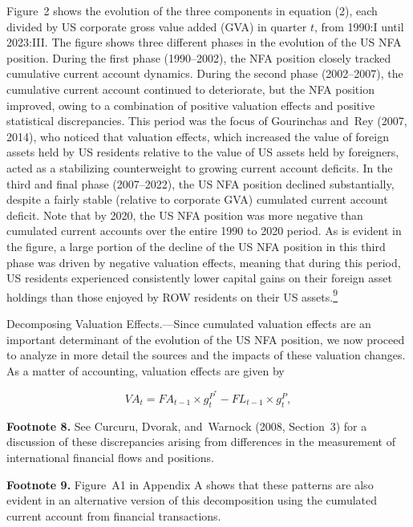 \documentclass[11pt]{article}
\begin{document}
Figure 2 shows the evolution of the three components in equation (2), each divided by US corporate gross value added (GVA) in quarter $t$, from 1990:I until 2023:III. The figure shows three different phases in the evolution of the US NFA position. During the first phase (1990–2002), the NFA position closely tracked cumulative current account dynamics. During the second phase (2002–2007), the cumulative current account continued to deteriorate, but the NFA position improved, owing to a combination of positive valuation effects and positive statistical discrepancies. This period was the focus of Gourinchas and Rey (2007, 2014), who noticed that valuation effects, which increased the value of foreign assets held by US residents relative to the value of US assets held by foreigners, acted as a stabilizing counterweight to growing current account deficits. In the third and final phase (2007–2022), the US NFA position declined substantially, despite a fairly stable (relative to corporate GVA) cumulated current account deficit. Note that by 2020, the US NFA position was more negative than cumulated current accounts over the entire 1990 to 2020 period. As is evident in the figure, a large portion of the decline of the US NFA position in this third phase was driven by negative valuation effects, meaning that during this period, US residents experienced consistently lower capital gains on their foreign asset holdings than those enjoyed by ROW residents on their US assets.\hyperlink{fn:9}{\textsuperscript{9}}


Decomposing Valuation Effects.—Since cumulated valuation effects are an important determinant of the evolution of the US NFA position, we now proceed to analyze in more detail the sources and the impacts of these valuation changes. As a matter of accounting, valuation effects are given by


\setcounter{equation}{2}
\begin{equation}\label{eq:3}
VA_t=FA_{t-1}\times g_t^{P^*}-FL_{t-1}\times g_t^P,
\end{equation}


{\footnotesize \hypertarget{fn:8}{}\textbf{Footnote 8.} See Curcuru, Dvorak, and Warnock (2008, Section 3) for a discussion of these discrepancies arising from differences in the measurement of international financial flows and positions.\par}


{\footnotesize \hypertarget{fn:9}{}\textbf{Footnote 9.} Figure A1 in Appendix A shows that these patterns are also evident in an alternative version of this decomposition using the cumulated current account from financial transactions.\par}
\end{document}
